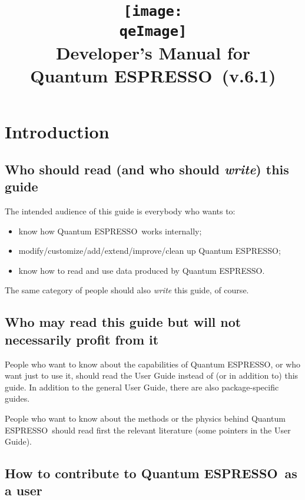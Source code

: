 \documentclass[12pt,a4paper]{article}
\def\version{6.1}
\def\qe{{\sc Quantum ESPRESSO}}
\def\qeImage{quantum_espresso.pdf}
\begin{document}
\author{}
\date{}
\title{
  \texttt{[image: \\qeImage]} \\
  \Huge Developer's Manual for \\ \qe\ (v.\version)
}
\maketitle

\tableofcontents

\newpage

\section{Introduction}

\subsection{Who should read (and who should {\em write}) this guide}

The intended audience of this guide is everybody who wants to:
\begin{itemize}
\item know how \qe\ works internally;
\item modify/customize/add/extend/improve/clean up \qe;
\item know how to read and use data produced by \qe.
\end{itemize}
The same category of people should also {\em write} this guide, of course.

\subsection{Who may read this guide but will not necessarily profit from it}

People who want to know about the capabilities of \qe,
or who want just to use it, should read the User Guide
instead of (or in addition to) this guide. In addition
to the general User Guide, there are also package-specific
guides.

People who want to know about the methods or the physics
behind \qe\ should read first the relevant
literature (some pointers in the User Guide).

\subsection{How to contribute to \qe\ as a user}
\end{document}
